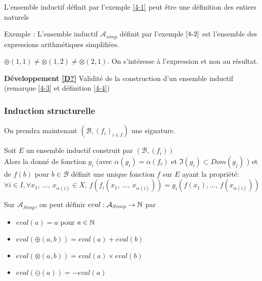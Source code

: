 \begin{example}
	L'ensemble inductif définit par l'exemple \ref{4-1} peut être une définition des entiers naturels \label{4-6}
\end{example}

\begin{example}
	Exemple : L'ensemble inductif $\mathcal A_{simp}$ définit par l'exemple $\ref{4-2}$ est l'ensemble des expressions arithmétiques simplifiées.
\end{example}

\begin{rem}
	$\oplus(1, 1) \neq \otimes(1, 2) \neq \otimes(2, 1)$. On s'intéresse à l'expression et non au résultat.
\end{rem}

\noindent \textbf{Développement \ref{D?}} Validité de la construction d'un ensemble inductif (remarque \ref{4-3} et définition \ref{4-4})

\subsubsection{Induction structurelle}
On prendra maintenant $(\mathcal B, (f_i)_{i \in I})$ une signature.

\begin{proposition}
	\label{4-5}
	Soit $E$ un ensemble inductif construit par $(\mathcal B, (f_i))$\\
	
	Alors la donné de fonction $g_i$ (avec $\alpha(g_i) = \alpha(f_i)$ et $\Im(g_i) \subset Dom(g_j)$ ) et de $f(b)$ pour $b \in \mathcal B$ définit une unique fonction $f$ sur $E$ ayant la propriété:
	$$\forall i \in I, \forall x_1, \, \dots , \, x_{\alpha(i)} \in X, \, f\left(f_i(x_1, \, \dots, \, x_{\alpha(i)})\right) =  g_i\left(f(x_1), \dots, \, f(x_{\alpha(i)})\right)$$
\end{proposition}

\begin{example}
	Sur $\mathcal A_{Simp}$, on peut définir $eval : \mathcal A_{Simp} \to \mathbb{N}$ par \begin{itemize}
		\item $eval(a) = a$ pour $a \in \mathbb{N}$
		\item $eval(\oplus(a, b)) = eval(a) + eval(b)$
		\item $eval(\otimes(a, b)) = eval(a) \times  eval(b)$
		\item $eval(\ominus(a)) = - eval(a)$
	\end{itemize}
\end{example}

